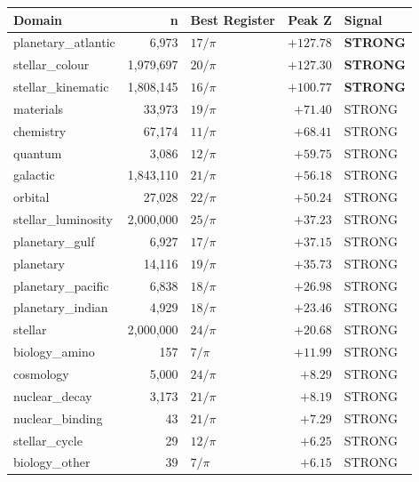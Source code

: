 \documentclass[11pt, letterpaper, openany]{book}
\begin{document}
\begin{table}[H]
\centering
\renewcommand{\arraystretch}{1.4}
\small
\begin{tabular}{|l|r|l|r|l|}
\hline
\rowcolor{kishblue!10}
\textbf{Domain} & \textbf{n} & \textbf{Best Register} & \textbf{Peak Z} & \textbf{Signal} \\
\hline\hline
\rowcolor{tidalblue!12}
planetary\_atlantic  & 6,973     & $17/\pi$ & $+127.78$ & \textbf{STRONG} \\
\rowcolor{colourgold!15}
stellar\_colour      & 1,979,697 & $20/\pi$ & $+127.30$ & \textbf{STRONG} \\
\rowcolor{kishblue!12}
stellar\_kinematic   & 1,808,145 & $16/\pi$ & $+100.77$ & \textbf{STRONG} \\
materials            & 33,973    & $19/\pi$ & $+71.40$  & STRONG \\
chemistry            & 67,174    & $11/\pi$ & $+68.41$  & STRONG \\
quantum              & 3,086     & $12/\pi$ & $+59.75$  & STRONG \\
galactic             & 1,843,110 & $21/\pi$ & $+56.18$  & STRONG \\
orbital              & 27,028    & $22/\pi$ & $+50.24$  & STRONG \\
stellar\_luminosity  & 2,000,000 & $25/\pi$ & $+37.23$  & STRONG \\
planetary\_gulf      & 6,927     & $17/\pi$ & $+37.15$  & STRONG \\
planetary            & 14,116    & $19/\pi$ & $+35.73$  & STRONG \\
planetary\_pacific   & 6,838     & $18/\pi$ & $+26.98$  & STRONG \\
planetary\_indian    & 4,929     & $18/\pi$ & $+23.46$  & STRONG \\
stellar              & 2,000,000 & $24/\pi$ & $+20.68$  & STRONG \\
biology\_amino       & 157       & $7/\pi$  & $+11.99$  & STRONG \\
cosmology            & 5,000     & $24/\pi$ & $+8.29$   & STRONG \\
nuclear\_decay       & 3,173     & $21/\pi$ & $+8.19$   & STRONG \\
nuclear\_binding     & 43        & $21/\pi$ & $+7.29$   & STRONG \\
stellar\_cycle       & 29        & $12/\pi$ & $+6.25$   & STRONG \\
biology\_other       & 39        & $7/\pi$  & $+6.15$   & STRONG \\

\end{tabular}
\end{table}
\end{document}

